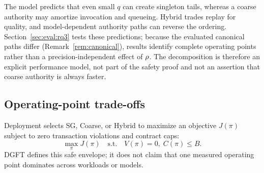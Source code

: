 The model predicts that even small $q$ can create singleton tails, whereas a
coarse authority may amortize invocation and queueing. Hybrid trades replay
for quality, and model-dependent authority paths can reverse the ordering.
Section~\ref{sec:eval:rq3} tests these predictions; because the evaluated
canonical paths differ (Remark~\ref{rem:canonical}), results identify complete
operating points rather than a precision-independent effect of $\rho$.
The decomposition is therefore an explicit performance model, not part of the
safety proof and not an assertion that coarse authority is always faster.

\subsection{Operating-point trade-offs}\label{sec:dgft:tradeoff}

Deployment selects SG, Coarse, or Hybrid to maximize an objective $J(\pi)$
subject to zero transaction violations and contract caps:
\[
 \max_{\pi}J(\pi)\quad\text{s.t.}\quad V(\pi)=0,\;C(\pi)\leq B.
\]
DGFT defines this safe envelope; it does not claim that one measured operating
point dominates across workloads or models.
